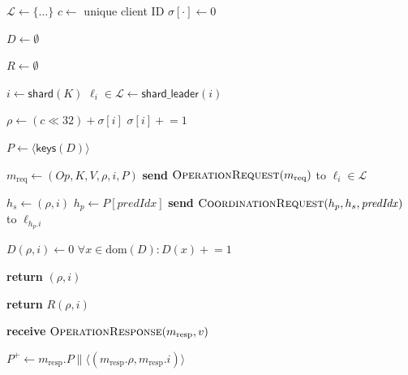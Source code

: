 \begin{algorithm}[!tb]
    \caption{Ellis\_CT Client}
    \label{ellis-ct-clientprotocol}
    \begin{algorithmic}[1]
      \State $\mathcal{L}\gets\{\ldots\}$ 
      \State $c\gets$ unique client ID
      \State $\sigma[\cdot]\gets 0$ 
  
      \State $D\gets\emptyset$
  
      \State $R\gets\emptyset$
  
        \State $i\gets\mathsf{shard}(K)$
        \State $\ell_i\in\mathcal{L}
          \gets\mathsf{shard\_leader}(i)$
  
        \State $\rho\gets(c\ll 32)+\sigma[i]$
        \State $\sigma[i]\mathrel{+}=1$
  
        \State $P\gets\langle\mathsf{keys}(D)\rangle$
  
        \State $m_{\mathrm{req}}
          \gets(\textit{Op},K,V,\rho,i,P)$
        \State \textbf{send} $\textsc{OperationRequest}(m_{\mathrm{req}})$
          to $\ell_i\in\mathcal{L}$

        \State $h_s\gets(\rho,i)$
        \State $h_p\gets P[\mathit{predIdx}]$
        \State \textbf{send}
            $\textsc{CoordinationRequest}(h_p,h_s,\mathit{predIdx})$
            to $\ell_{h_p.i}$
        \EndFor
  
        \State $D(\rho,i)\gets 0$
        \State $\forall x\in\mathrm{dom}(D):
          D(x)\mathrel{+}=1$
  
        \State \textbf{return} $(\rho,i)$
      \EndProcedure
  
          \State \textbf{return} $\mathit{R}(\rho,i)$
        \EndIf
  
            \State \textbf{receive}
              $\textsc{OperationResponse}(m_{\mathrm{resp}},v)$

          \State $P^+\gets
            m_{\mathrm{resp}}.P
            \mathbin{\|}
            \langle
            (m_{\mathrm{resp}}.\rho,m_{\mathrm{resp}}.i)
            \rangle$


\end{algorithmic}
\end{algorithm}
